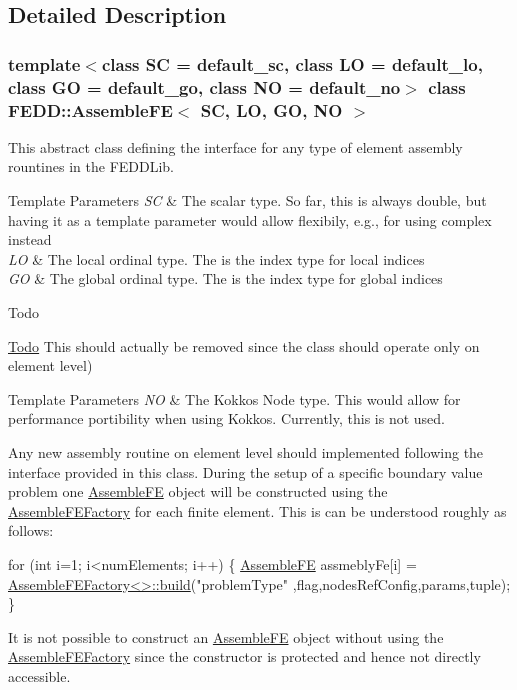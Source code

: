 \subsection{Detailed Description}
\subsubsection*{template$<$class SC = default\+\_\+sc, class LO = default\+\_\+lo, class GO = default\+\_\+go, class NO = default\+\_\+no$>$\newline
class F\+E\+D\+D\+::\+Assemble\+F\+E$<$ S\+C, L\+O, G\+O, N\+O $>$}

This abstract class defining the interface for any type of element assembly rountines in the F\+E\+D\+D\+Lib. 


\begin{DoxyTemplParams}{Template Parameters}
{\em SC} & The scalar type. So far, this is always double, but having it as a template parameter would allow flexibily, e.\+g., for using complex instead \\
\hline
{\em LO} & The local ordinal type. The is the index type for local indices \\
\hline
{\em GO} & The global ordinal type. The is the index type for global indices \\
\hline
\end{DoxyTemplParams}
\begin{DoxyRefDesc}{Todo}
\item[\hyperlink{todo__todo000001}{Todo}]This should actually be removed since the class should operate only on element level) \end{DoxyRefDesc}

\begin{DoxyTemplParams}{Template Parameters}
{\em NO} & The Kokkos Node type. This would allow for performance portibility when using Kokkos. Currently, this is not used.\\
\hline
\end{DoxyTemplParams}
Any new assembly routine on element level should implemented following the interface provided in this class. During the setup of a specific boundary value problem one \hyperlink{classFEDD_1_1AssembleFE}{Assemble\+FE} object will be constructed using the \hyperlink{classFEDD_1_1AssembleFEFactory}{Assemble\+F\+E\+Factory} for each finite element. This is can be understood roughly as follows\+: 
\begin{DoxyCode}
\textcolor{keywordflow}{for} (\textcolor{keywordtype}{int} i=1; i<numElements; i++) \{
    \hyperlink{classFEDD_1_1AssembleFE_a5ff56b610942ec92cc1b1e0ac1e07ce4}{AssembleFE} assmeblyFe[i] = \hyperlink{classFEDD_1_1AssembleFEFactory_ac895d65acf2626100832586df84d6a9c}{AssembleFEFactory<>::build}(\textcolor{stringliteral}{"problemType"}
      ,flag,nodesRefConfig,params,tuple);
\}
\end{DoxyCode}
 It is not possible to construct an \hyperlink{classFEDD_1_1AssembleFE}{Assemble\+FE} object without using the \hyperlink{classFEDD_1_1AssembleFEFactory}{Assemble\+F\+E\+Factory} since the constructor is protected and hence not directly accessible.

